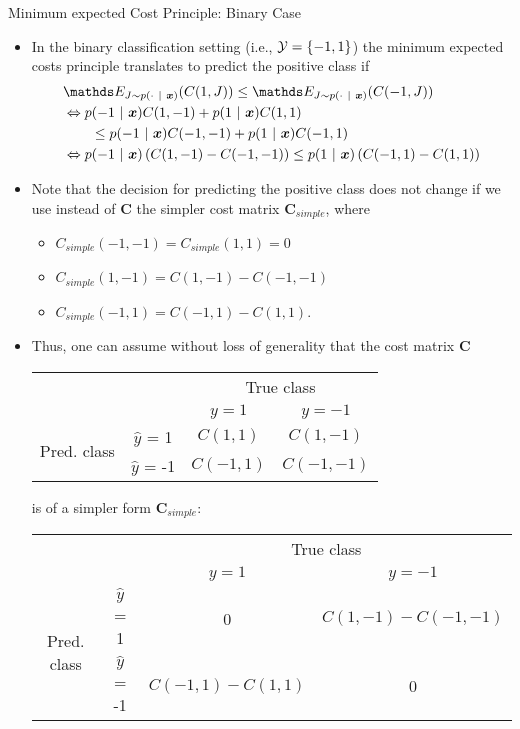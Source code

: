 \begin{vbframe}{Minimum expected Cost Principle: Binary Case}
	\footnotesize{
		\begin{itemize}\footnotesize
			\item In the binary classification setting (i.e., $\mathcal{Y} = \{-1,1\}$) the minimum expected costs principle translates to predict the positive class if 
%			
			\begin{align*}
%				
					&\E_{J \sim p(\cdot ~|~ \xv)}( C(1,J) )  \leq \E_{J \sim p(\cdot ~|~ \xv)}( C(-1,J) ) \\
%
				 	&\Leftrightarrow p(-1 ~|~ \xv ) C(1,-1)  + 	p(1 ~|~ \xv ) C(1,1) \\ &
				 	\qquad \leq  p(-1 ~|~ \xv ) C(-1,-1)  + 	p(1 ~|~ \xv ) C(-1,1)  \\
%				 	
					&\Leftrightarrow p(-1 ~|~ \xv ) \left( C(1,-1) - C(-1,-1) \right)  \leq  	p(1 ~|~ \xv ) \left( C(-1,1) -C(1,1)\right)  
%				
			\end{align*}
			\item Note that the decision for predicting the positive class does not change if we use instead of $\mathbf{C}$ the simpler cost matrix $\mathbf{C}_{simple}$, where 
			\begin{itemize}
				\footnotesize
				 \item $C_{simple}(-1,-1)=C_{simple}(1,1) = 0$ 
				 \item  $C_{simple}(1,-1) =  C(1,-1) - C(-1,-1) $ 
				 \item $C_{simple}(-1,1) = C(-1,1) -C(1,1).$
			\end{itemize} 
%		
		\item Thus, one can assume without loss of generality that the cost matrix $\mathbf{C}$
		\lz
		
		\begin{tabular}{cc|cc}
			& &\multicolumn{2}{c}{True class} \\
			& & $y=1$ & $y=-1$  \\
			\hline
			\multirow{2}{*}{\parbox{0.3cm}{Pred.  class}}& $\hat y$ = 1     & $C(1,1)$                & $C(1,-1)$\\
			& $\hat y$ = -1 & $C(-1,1)$              &  $C(-1,-1)$   \\
		\end{tabular}
%		

		\lz
		is of a simpler form  $\mathbf{C}_{simple}$:
		\lz
		\lz
		
%		
		\begin{tabular}{cc|cc}
			& &\multicolumn{2}{c}{True class} \\
			& & $y=1$ & $y=-1$  \\
			\hline
			\multirow{2}{*}{\parbox{0.3cm}{Pred.  class}}& $\hat y$ = 1     & 0                 & $C(1,-1) - C(-1,-1) $\\
			& $\hat y$ = -1 & $C(-1,1) -C(1,1)$              & 0\\
		\end{tabular}


\end{itemize}}
\end{vbframe}
